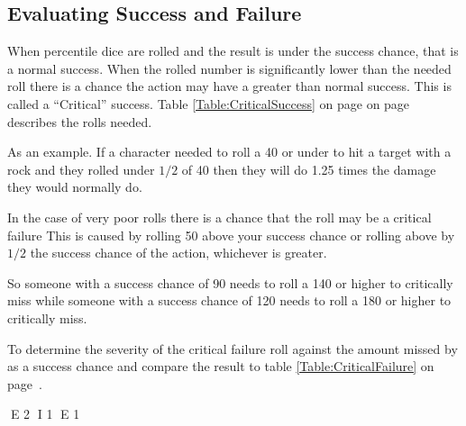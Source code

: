 \subsection{Evaluating Success and Failure}

When percentile dice are rolled and the result is under the success chance, that
is a normal success. When the rolled number is significantly lower than the needed 
roll there is a chance the action may have a greater than normal success. This is 
called a ``Critical'' success. Table \ref{Table:CriticalSuccess} on page on
page~\pageref{Table:CriticalSuccess} describes the rolls needed.

As an example. If a character needed to roll a 40 or under to hit a target 
with a rock and they rolled under $ 1/2 $ of 40 then they will do 1.25
times the damage they would normally do.

In the case of very poor rolls there is a chance that the roll  
may be a critical failure This is caused by rolling 50 above your success chance or 
rolling above by $ 1/2 $ the success chance of the action, whichever is greater.

So someone with a success chance of 90 needs to roll a 140 or higher to
critically miss while someone with a success chance of 120 needs to roll a
180 or higher to critically miss.

To determine the severity of the critical failure roll against the 
amount missed by as a success chance and compare the result to table
\ref{Table:CriticalFailure} on page~\pageref{Table:CriticalFailure}.



E 2
I 1
E 1
